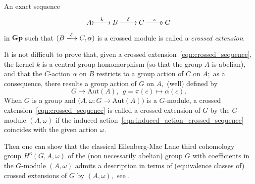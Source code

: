 \documentclass[a4paper]{amsart}
\theoremstyle{plain}
\theoremstyle{definition}
\theoremstyle{remark}
\begin{document}
An exact sequence
\begin{equation}
\label{eqn:crossed_sequence}
\xymatrix{
A \ar@{>->}[r]^-k &B \ar[r]^-{\delta} &C \ar@{->>}[r]^-{\pi} &G
}
\end{equation}
in $\mathbf{Gp}$ such that $(B\xlongrightarrow{\delta} C,\alpha)$ is a crossed module is called a \emph{crossed extension}.

It is not difficult to prove that, given a crossed extension~\eqref{eqn:crossed_sequence}, the kernel $k$ is a central group  homomorphism (so that the group $A$ is abelian), and that the $C$-action $\alpha$ on $B$ restricts to a group action of $C$ on $A;$ as a consequence, there results a group action of $G$ on $A,$ (well) defined by
\begin{equation}
\label{eqn:induced_action_crossed_sequence}
G\rightarrow \mathrm{Aut}(A), \ \ g=\pi(c)\mapsto \alpha(c).
\end{equation}
When $G$ is a group and $\big(A,\omega\colon G\rightarrow\mathrm{Aut}(A)\big)$ is a $G$-module, a crossed extension~\eqref{eqn:crossed_sequence} is called a crossed extension of $G$ by the $G$-module $(A,\omega)$ if the induced action~\eqref{eqn:induced_action_crossed_sequence} coincides with the given action $\omega.$

Then one can show that the classical Eilenberg-Mac Lane third cohomology group $H^3(G,A,\omega)$ \cite{EML} of the (non necessarily abelian) group $G$ with coefficients in the $G$-module $(A,\omega)$ admits a description in terms of (equivalence classes of) crossed extensions of $G$ by $(A,\omega),$ see \cite{Holt, Huebschmann}.
\end{document}
